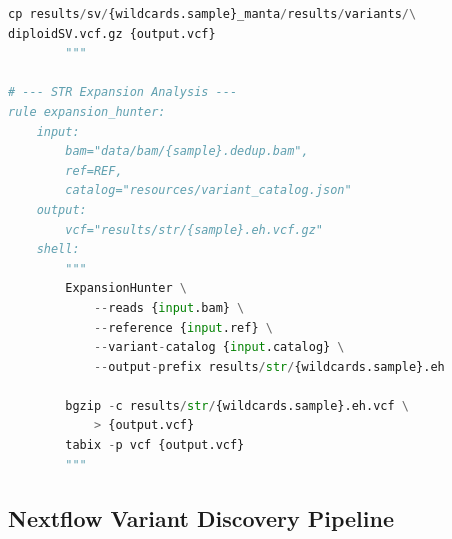 \begin{lstlisting}[language=Python, caption={Snakemake pipeline for germline variant calling, filtering, and annotation.}, label={lst:snakemake_variants}]
        cp results/sv/{wildcards.sample}_manta/results/variants/\
diploidSV.vcf.gz {output.vcf}
        """

# --- STR Expansion Analysis ---
rule expansion_hunter:
    input:
        bam="data/bam/{sample}.dedup.bam",
        ref=REF,
        catalog="resources/variant_catalog.json"
    output:
        vcf="results/str/{sample}.eh.vcf.gz"
    shell:
        """
        ExpansionHunter \
            --reads {input.bam} \
            --reference {input.ref} \
            --variant-catalog {input.catalog} \
            --output-prefix results/str/{wildcards.sample}.eh

        bgzip -c results/str/{wildcards.sample}.eh.vcf \
            > {output.vcf}
        tabix -p vcf {output.vcf}
        """
\end{lstlisting}

\subsection{Nextflow Variant Discovery Pipeline}

